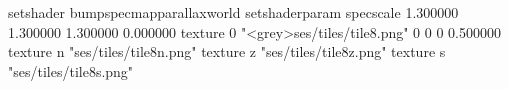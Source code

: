 setshader bumpspecmapparallaxworld
setshaderparam specscale 1.300000 1.300000 1.300000 0.000000
texture 0 "<grey>ses/tiles/tile8.png" 0 0 0 0.500000
texture n "ses/tiles/tile8n.png"
texture z "ses/tiles/tile8z.png"
texture s "ses/tiles/tile8s.png"

